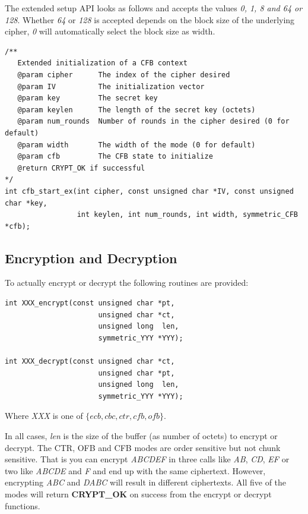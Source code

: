 \documentclass[synpaper]{book}
\begin{document}
The extended setup API looks as follows and accepts the values \textit{0, 1, 8 and 64 or 128}.  Whether \textit{64} or \textit{128} is
accepted depends on the block size of the underlying cipher, \textit{0} will automatically select the block size as width.

\begin{small}
\begin{verbatim}
/**
   Extended initialization of a CFB context
   @param cipher      The index of the cipher desired
   @param IV          The initialization vector
   @param key         The secret key
   @param keylen      The length of the secret key (octets)
   @param num_rounds  Number of rounds in the cipher desired (0 for default)
   @param width       The width of the mode (0 for default)
   @param cfb         The CFB state to initialize
   @return CRYPT_OK if successful
*/
int cfb_start_ex(int cipher, const unsigned char *IV, const unsigned char *key,
                 int keylen, int num_rounds, int width, symmetric_CFB *cfb);
\end{verbatim}
\end{small}

\subsection{Encryption and Decryption}
To actually encrypt or decrypt the following routines are provided:
   
     
\begin{verbatim}
int XXX_encrypt(const unsigned char *pt,
                      unsigned char *ct,
                      unsigned long  len,
                      symmetric_YYY *YYY);

int XXX_decrypt(const unsigned char *ct,
                      unsigned char *pt,
                      unsigned long  len,
                      symmetric_YYY *YYY);
\end{verbatim}
Where \textit{XXX} is one of $\lbrace ecb, cbc, ctr, cfb, ofb \rbrace$.

In all cases, \textit{len} is the size of the buffer (as number of octets) to encrypt or decrypt.  The CTR, OFB and CFB modes are order sensitive but not
chunk sensitive.  That is you can encrypt \textit{ABCDEF} in three calls like \textit{AB}, \textit{CD}, \textit{EF} or two like \textit{ABCDE} and \textit{F}
and end up with the same ciphertext.  However, encrypting \textit{ABC} and \textit{DABC} will result in different ciphertexts.  All
five of the modes will return {\bf CRYPT\_OK} on success from the encrypt or decrypt functions.
\end{document}
